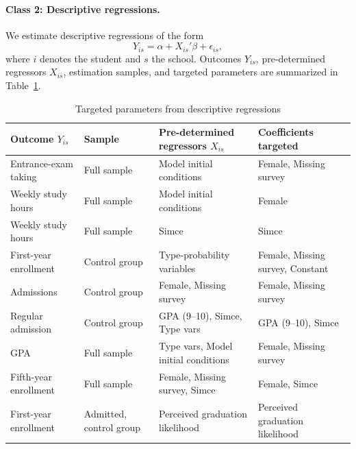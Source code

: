 \paragraph{Class 2: Descriptive regressions.}
We estimate descriptive regressions of the form
\begin{equation}
Y_{is} = \alpha + X_{is}'\beta + \epsilon_{is},
\end{equation}
where $i$ denotes the student and $s$ the school. Outcomes $Y_{is}$, pre-determined regressors $X_{is}$, estimation samples, and targeted parameters are summarized in Table~\ref{tab:desc_regs}.

\begin{table}[H] %
\centering
\caption{Targeted parameters from descriptive regressions}\label{tab:desc_regs}
\begin{tabularx}{\textwidth}{l l X X}
\toprule
Outcome $Y_{is}$ & Sample & Pre-determined regressors $X_{is}$ & Coefficients targeted \\
\midrule
Entrance-exam taking & Full sample & Model initial conditions &
Female, Missing survey \\
Weekly study hours & Full sample & Model initial conditions &
Female \\
Weekly study hours & Full sample &  Simce &
Simce \\

First-year enrollment & Control group &
Type-probability variables &
Female, Missing survey, Constant \\

Admissions & Control group &
Female, Missing survey &
Female, Missing survey \\

Regular admission & Control group &
GPA (9--10), Simce, Type vars &
GPA (9--10), Simce \\

GPA & Full sample &
Type vars, Model initial conditions &
Female, Missing survey \\

Fifth-year enrollment & Full sample &
Female, Missing survey, Simce &
Female, Simce \\

First-year enrollment & Admitted, control group &
Perceived graduation likelihood &
Perceived graduation likelihood \\
\bottomrule
\end{tabularx}
\end{table}






